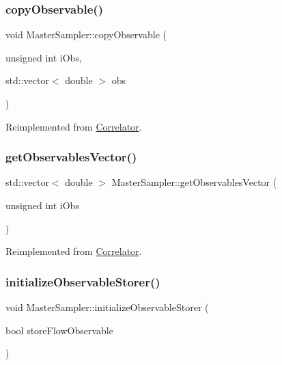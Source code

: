 \subsubsection{\texorpdfstring{copyObservable()}{copyObservable()}}
{\footnotesize\ttfamily void Master\+Sampler\+::copy\+Observable (\begin{DoxyParamCaption}\item[{unsigned int}]{i\+Obs,  }\item[{std\+::vector$<$ double $>$}]{obs }\end{DoxyParamCaption})\hspace{0.3cm}{\ttfamily [virtual]}}



Reimplemented from \mbox{\hyperlink{class_correlator_ac780d8b180294ee4801ede6e6a13f7f4}{Correlator}}.

\mbox{\label{class_master_sampler_a471dffa3f29c68b4152b195708a9a5ac}} 
\subsubsection{\texorpdfstring{getObservablesVector()}{getObservablesVector()}}
{\footnotesize\ttfamily std\+::vector$<$ double $>$ Master\+Sampler\+::get\+Observables\+Vector (\begin{DoxyParamCaption}\item[{unsigned int}]{i\+Obs }\end{DoxyParamCaption})\hspace{0.3cm}{\ttfamily [virtual]}}



Reimplemented from \mbox{\hyperlink{class_correlator_a7fb062b098beb078f3e546f4717b4941}{Correlator}}.

\mbox{\label{class_master_sampler_a88e2eec68ea6bd60cc3f375ac04a8ded}} 
\subsubsection{\texorpdfstring{initializeObservableStorer()}{initializeObservableStorer()}}
{\footnotesize\ttfamily void Master\+Sampler\+::initialize\+Observable\+Storer (\begin{DoxyParamCaption}\item[{bool}]{store\+Flow\+Observable }\end{DoxyParamCaption})\hspace{0.3cm}{\ttfamily [virtual]}}



